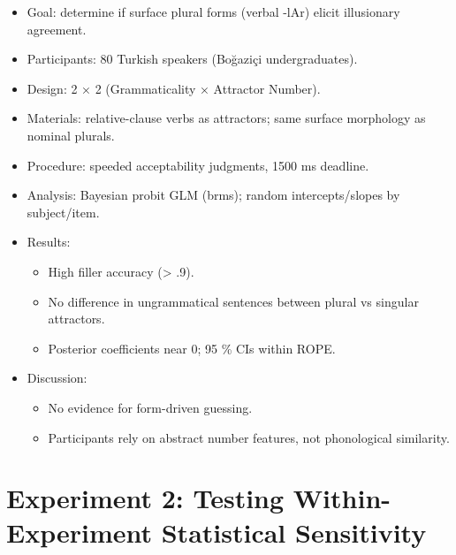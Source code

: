 \documentclass[
  authoryear,
  preprint]{elsarticle}
\providecommand{\tightlist}{%
  \setlength{\itemsep}{0pt}\setlength{\parskip}{0pt}}
\begin{document}
\begin{itemize}
\tightlist
\item
  Goal: determine if surface plural forms (verbal -lAr) elicit
  illusionary agreement.
\item
  Participants: 80 Turkish speakers (Boğaziçi undergraduates).
\item
  Design: 2 × 2 (Grammaticality × Attractor Number).
\item
  Materials: relative-clause verbs as attractors; same surface
  morphology as nominal plurals.
\item
  Procedure: speeded acceptability judgments, 1500 ms deadline.
\item
  Analysis: Bayesian probit GLM (brms); random intercepts/slopes by
  subject/item.
\item
  Results:

  \begin{itemize}
  \tightlist
  \item
    High filler accuracy (\textgreater{} .9).
  \item
    No difference in ungrammatical sentences between plural vs singular
    attractors.
  \item
    Posterior coefficients near 0; 95 \% CIs within ROPE.
  \end{itemize}
\item
  Discussion:

  \begin{itemize}
  \tightlist
  \item
    No evidence for form-driven guessing.
  \item
    Participants rely on abstract number features, not phonological
    similarity.
  \end{itemize}
\end{itemize}

\section{Experiment 2: Testing Within-Experiment Statistical
Sensitivity}\label{experiment-2-testing-within-experiment-statistical-sensitivity}
\end{document}
